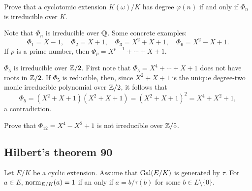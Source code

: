 \begin{exercise}
    Prove that a cyclotomic extension $K(\omega)/K$ has degree $\varphi(n)$ if and only if 
    $\Phi_n$ is irreducible over $K$. 
\end{exercise}

Note that $\Phi_n$ is irreducible over $\mathbb{Q}$. Some concrete examples:
\[
\Phi_1=X-1,
\quad
\Phi_2=X+1,
\quad
\Phi_3=X^2+X+1,
\quad
\Phi_6=X^2-X+1.
\]
If $p$ is a prime number, then $\Phi_p=X^{p-1}+\cdots+X+1$. 

\begin{example}
    $\Phi_5$ is irreducible over $\mathbb{Z}/2$. First note that
    $\Phi_5=X^{4}+\cdots+X+1$ does not have roots in $\mathbb{Z}/2$. If 
    $\Phi_5$ is reducible, then, since
    $X^2+X+1$ is the unique degree-two 
    monic irreducible polynomial 
    over $\mathbb{Z}/2$, it follows that
    \[
    \Phi_5=(X^2+X+1)(X^2+X+1)=(X^2+X+1)^2=X^4+X^2+1,
    \]
    a contradiction.
\end{example}

\begin{exercise}
Prove that
$\Phi_{12}=X^4-X^2+1$ is not irreducible over $\mathbb{Z}/5$. 
\end{exercise}

\subsection{Hilbert's theorem 90}

\begin{theorem}[Hilbert]
    Let $E/K$ be a cyclic extension. Assume that 
    $\operatorname{Gal}(E/K)$ is generated by $\tau$. For 
    $a\in E$, $\operatorname{norm}_{E/K}(a)=1$ if an only 
    if $a=b/\tau(b)$ for some $b\in L\setminus\{0\}$. 
\end{theorem}

